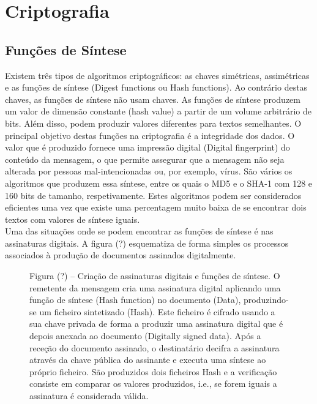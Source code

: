 \documentclass[a4paper,11pt,openright,oneside]{report}
\begin{document}
\chapter{Criptografia}
\label{chap.criptografia}

\section{Funções de Síntese}

Existem três tipos de algoritmos criptográficos: as chaves simétricas, assimétricas e as funções de síntese (Digest functions ou Hash functions). Ao contrário destas chaves, as funções de síntese não usam chaves. As funções de síntese produzem um valor de dimensão constante (hash value) a partir de um volume arbitrário de bits. Além disso, podem produzir valores diferentes para textos semelhantes. O principal objetivo destas funções na criptografia é a integridade dos dados. O valor que é produzido fornece uma impressão digital (Digital fingerprint) do conteúdo da mensagem, o que permite assegurar que a mensagem não seja alterada por pessoas mal-intencionadas ou, por exemplo, vírus. São vários os algoritmos que produzem essa síntese, entre os quais o MD5 e o SHA-1 com 128 e 160 bits de tamanho, respetivamente. Estes algoritmos podem ser considerados eficientes uma vez que existe uma percentagem muito baixa de se encontrar dois textos com valores de síntese iguais.\\

Uma das situações onde se podem encontrar as funções de síntese é nas assinaturas digitais. A figura (?) esquematiza de forma simples os processos associados à produção de documentos assinados digitalmente.

\begin{figure}[ht]
\center
{}
\caption{Figura (?) – Criação de assinaturas digitais e funções de síntese. O remetente da mensagem cria uma assinatura digital aplicando uma função de síntese (Hash function) no documento (Data), produzindo-se um ficheiro sintetizado (Hash). Este ficheiro é cifrado usando a sua chave privada de forma a produzir uma assinatura digital que é depois anexada ao documento (Digitally signed data). Após a receção do documento assinado, o destinatário decifra a assinatura através da chave pública do assinante e executa uma síntese ao próprio ficheiro. São produzidos dois ficheiros Hash e a verificação consiste em comparar os valores produzidos, i.e., se forem iguais a assinatura é considerada válida.}
\label{fig:crypto5}
\end{figure}
\end{document}
